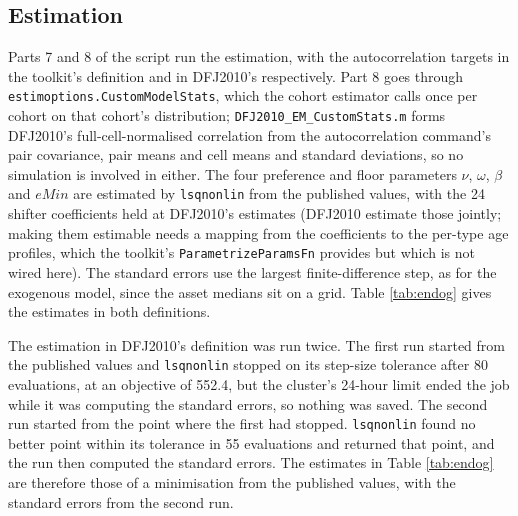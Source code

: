 \documentclass[11pt,fleqn]{article}
\begin{document}
\clearpage
\subsection{Estimation}
Parts 7 and 8 of the script run the estimation, with the autocorrelation targets in the toolkit's definition and in DFJ2010's respectively. Part 8 goes through \texttt{estimoptions.CustomModelStats}, which the cohort estimator calls once per cohort on that cohort's distribution; \texttt{DFJ2010\_EM\_CustomStats.m} forms DFJ2010's full-cell-normalised correlation from the autocorrelation command's pair covariance, pair means and cell means and standard deviations, so no simulation is involved in either. The four preference and floor parameters $\nu$, $\omega$, $\beta$ and $eMin$ are estimated by \texttt{lsqnonlin} from the published values, with the 24 shifter coefficients held at DFJ2010's estimates (DFJ2010 estimate those jointly; making them estimable needs a mapping from the coefficients to the per-type age profiles, which the toolkit's \texttt{ParametrizeParamsFn} provides but which is not wired here). The standard errors use the largest finite-difference step, as for the exogenous model, since the asset medians sit on a grid. Table \ref{tab:endog} gives the estimates in both definitions.

The estimation in DFJ2010's definition was run twice. The first run started from the published values and \texttt{lsqnonlin} stopped on its step-size tolerance after 80 evaluations, at an objective of 552.4, but the cluster's 24-hour limit ended the job while it was computing the standard errors, so nothing was saved. The second run started from the point where the first had stopped. \texttt{lsqnonlin} found no better point within its tolerance in 55 evaluations and returned that point, and the run then computed the standard errors. The estimates in Table \ref{tab:endog} are therefore those of a minimisation from the published values, with the standard errors from the second run.
\end{document}
